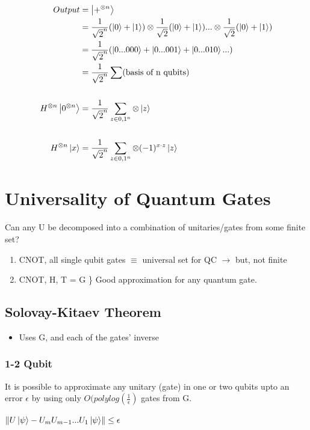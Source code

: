\documentclass{article}
\begin{document}
\begin{align*}
Output &= \ket{+^{\otimes n}}\\
&= \frac{1}{\sqrt{2}^{n}} (\ket{0} + \ket{1}) \otimes \frac{1}{\sqrt{2}} (\ket{0} + \ket{1}) ... \otimes \frac{1}{\sqrt{2}} (\ket{0} + \ket{1}) \\
&= \frac{1}{\sqrt{2}^{n}} (\ket{0...000} + \ket{0...001} + \ket{0...010} ...)\\
&= \frac{1}{\sqrt{2}^{n}} \sum (\text{basis of n qubits)}\\\\
H^{\otimes n} \ket{0^{\otimes n}} &= \frac{1}{\sqrt{2}^{n}} \sum \limits _{z \in {0,1}^{n}} \otimes \ket{z}\\\\
H^{\otimes n} \ket{x} &= \frac{1}{\sqrt{2}^{n}} \sum \limits _{z \in {0,1}^{n}} \otimes (-1)^{x \cdot z}\ket{z}
\end{align*}

\section{Universality of Quantum Gates}
Can any U be decomposed into a combination of unitaries/gates from some finite set?

\begin{enumerate}
    \item {CNOT, all single qubit gates} $\equiv$ universal set for QC $\xrightarrow{}$ but, not finite
    \item{CNOT, H, T} = G \} Good approximation for any quantum gate.
\end{enumerate}

\subsection{Solovay-Kitaev Theorem}
\begin{itemize}
    \item Uses G, and each of the gates' inverse
\end{itemize}

\subsubsection{1-2 Qubit}
It is possible to approximate any unitary (gate) in one or two qubits upto an error $\epsilon$ by using only $O(polylog(\frac{1}{\epsilon})$ gates from G.

$\norm{U \ket{\psi} - U_{m} U_{m-1} ... U_{1} \ket{\psi}} \leq \epsilon$
\end{document}
